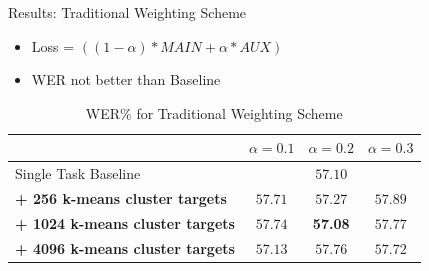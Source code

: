 \documentclass[final]{beamer} %
\begin{document}
\begin{frame}
\begin{columns}
\begin{column}{0.23\textwidth}
{        \vspace{1cm}
        
        \begin{block}{\boxnumber Results: Traditional Weighting Scheme}
          \begin{itemize}
          \item Loss = $((1-\alpha)*MAIN + \alpha*AUX)$
          \item WER not better than Baseline
          \end{itemize}
        \end{block}

        
        \vfill
        

                  
          \begin{table}[!htbp]
            \centering
            \caption{WER\% for Traditional Weighting Scheme}
            \begin{adjustbox}{width=\textwidth}
              \begin{tabular}{lccc}
                \toprule
                & $\alpha = 0.1 $ & $\alpha = 0.2 $ & $\alpha = 0.3 $\\
                \midrule
                Single Task Baseline  &  \multicolumn{3}{c}{$57.10$ \raisebox{.33\height}{\footnotesize{$\pm 3.25$}}}     \\
                \textbf{+ 256 k-means cluster targets}  &  $57.71$ \raisebox{.33\height}{\footnotesize{$\pm 1.59$}}   &  $57.27$ \raisebox{.33\height}{\footnotesize{$\pm 1.60$}}     & $57.89$ \raisebox{.33\height}{\footnotesize{$\pm 1.29$}} \\
                \textbf{+ 1024 k-means cluster targets}   & $57.74$ \raisebox{.33\height}{\footnotesize{$\pm 3.17$}}    & \textbf{57.08} \raisebox{.33\height}{\footnotesize{$\pm 2.62$}}    & $57.77$ \raisebox{.33\height}{\footnotesize{$\pm 0.79$}}  \\
                \textbf{+ 4096 k-means cluster targets}   &  $57.13$ \raisebox{.33\height}{\footnotesize{$\pm 2.45$}}  & $57.76$ \raisebox{.33\height}{\footnotesize{$\pm 1.61$}}   &   $57.72$ \raisebox{.33\height}{\footnotesize{$\pm 0.64$}}  \\
                \bottomrule
              \end{tabular}
            \end{adjustbox}
          \end{table}


          \vfill
          
}
\end{column}
\end{columns}
\end{frame}
\end{document}
